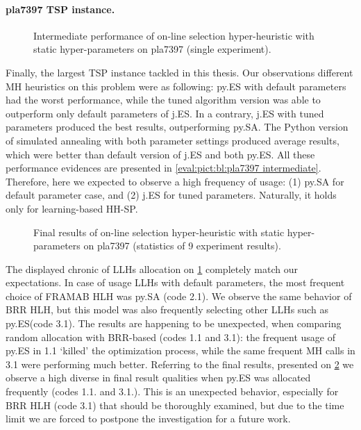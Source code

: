 \newpage
\paragraph{pla7397 TSP instance.}
\begin{figure}[t]
	\centering
	\vspace{-20pt}
	
	\caption{Intermediate performance of on-line selection hyper-heuristic with static hyper-parameters on pla7397 (single experiment).}
	\vspace{-10pt}
	\label{eval:pict:hh-sp:pla7397 intermediate}
\end{figure}
Finally, the largest TSP instance tackled in this thesis. Our observations different MH heuristics on this problem were as following: py.ES with default parameters had the worst performance, while the tuned algorithm version was able to outperform only default parameters of j.ES. In a contrary, j.ES with tuned parameters produced the best results, outperforming py.SA. The Python version of simulated annealing with both parameter settings produced average results, which were better than default version of j.ES and both py.ES. All these performance evidences are presented in \cref{eval:pict:bl:pla7397 intermediate}. Therefore, here we expected to observe a high frequency of usage: (1) py.SA for default parameter case, and (2) j.ES for tuned parameters. Naturally, it holds only for learning-based HH-SP.


\begin{figure}[b]
	\centering
	\vspace{-20pt}
	
	\caption{Final results of on-line selection hyper-heuristic with static hyper-parameters on pla7397 (statistics of 9 experiment results).}
	\vspace{-5pt}
	\label{eval:pict:hh-sp:pla7397 final}
\end{figure}

The displayed chronic of LLHs allocation on \cref{eval:pict:hh-sp:pla7397 intermediate} completely match our expectations. In case of usage LLHs with default parameters, the most frequent choice of FRAMAB HLH was py.SA (code 2.1). We observe the same behavior of BRR HLH, but this model was also frequently selecting other LLHs such as py.ES(code 3.1). The results are happening to be unexpected, when comparing random allocation with BRR-based (codes 1.1 and 3.1): the frequent usage of py.ES in 1.1 `killed' the optimization process, while the same frequent MH calls in 3.1 were performing much better. Referring to the final results, presented on \cref{eval:pict:hh-sp:pla7397 final} we observe a high diverse in final result qualities when py.ES was allocated frequently (codes 1.1. and 3.1.). This is an unexpected behavior, especially for BRR HLH (code 3.1) that should be thoroughly examined, but due to the time limit we are forced to postpone the investigation for a future work.

